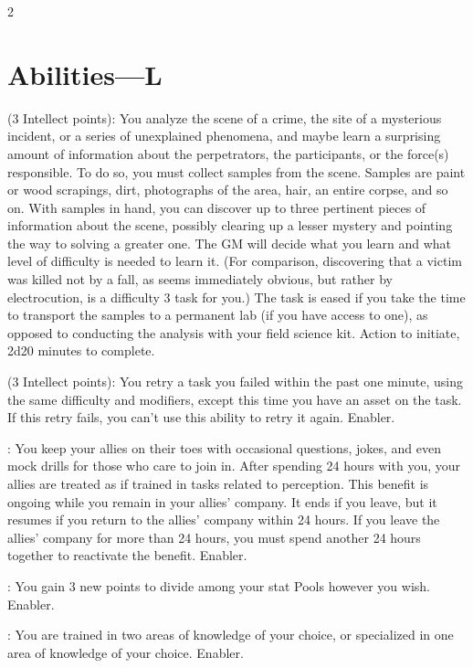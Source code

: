 \begin{multicols}{2}

\section{Abilities—L}

 (3 Intellect points): You analyze the scene of a crime, the site of a mysterious incident, or a series of unexplained phenomena, and maybe learn a surprising amount of information about the perpetrators, the participants, or the force(s) responsible. To do so, you must collect samples from the scene. Samples are paint or wood scrapings, dirt, photographs of the area, hair, an entire corpse, and so on. With samples in hand, you can discover up to three pertinent pieces of information about the scene, possibly clearing up a lesser mystery and pointing the way to solving a greater one. The GM will decide what you learn and what level of difficulty is needed to learn it. (For comparison, discovering that a victim was killed not by a fall, as seems immediately obvious, but rather by electrocution, is a difficulty 3 task for you.) The task is eased if you take the time to transport the samples to a permanent lab (if you have access to one), as opposed to conducting the analysis with your field science kit. Action to initiate, 2d20 minutes to complete. 
 
 (3 Intellect points): You retry a task you failed within the past one minute, using the same difficulty and modifiers, except this time you have an asset on the task. If this retry fails, you can’t use this ability to retry it again. Enabler. 
 
: You keep your allies on their toes with occasional questions, jokes, and even mock drills for those who care to join in. After spending 24 hours with you, your allies are treated as if trained in tasks related to perception. This benefit is ongoing while you remain in your allies’ company. It ends if you leave, but it resumes if you return to the allies’ company within 24 hours. If you leave the allies’ company for more than 24 hours, you must spend another 24 hours together to reactivate the benefit. Enabler. 
 
: You gain 3 new points to divide among your stat Pools however you wish. Enabler. 
 
: You are trained in two areas of knowledge of your choice, or specialized in one area of knowledge of your choice. Enabler.
 

\end{multicols}
